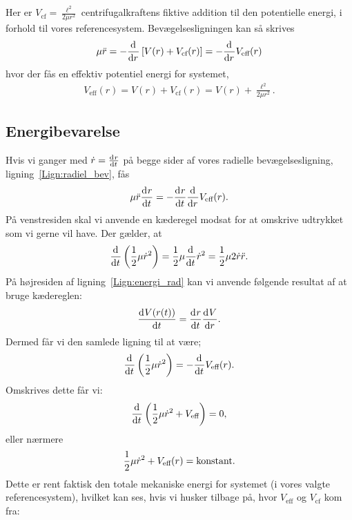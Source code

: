 Her er $V_\text{cf} = \frac{\ell ^2}{2\mu r^2}$ centrifugalkraftens fiktive addition til den potentielle energi, i forhold til vores referencesystem. Bevægelsesligningen kan så skrives
\begin{align} \label{Lign:radiel_bev}
	\mu \ddt{r} = -\dif{r}{} \left[V(r) + V_\text{cf} (r)\right] = -\dif{r}{} V_\text{eff}(r)
\end{align}
hvor der fås en effektiv potentiel energi for systemet, 
\begin{align}
	V_\text{eff}(r) = V(r) + V_\text{cf}(r) = V(r) + 	\frac{\ell ^2}{2\mu r^2}.
\end{align}

\subsection{Energibevarelse}
Hvis vi ganger med $\dt{r} = \dif{t}{r}$ på begge sider af vores radielle bevægelsesligning, ligning~\eqref{Lign:radiel_bev}, fås
\begin{align}\label{Lign:energi_rad}
	\mu \ddt{r} \dif{t}{r} = -\dif{t}{r} \dif{r}{} V_\text{eff}(r). 
\end{align}
På venstresiden skal vi anvende en kæderegel modsat for at omskrive udtrykket som vi gerne vil have. Der gælder, at 
\begin{align}
\dif{t}{} \left( \frac{1}{2} \mu \dt{r}^2 \right) = \frac{1}{2} \mu \dif{t}{} \dt{r}^2 = \frac{1}{2} \mu 2\dt{r} \ddt{r}.
\end{align}
På højresiden af ligning~\eqref{Lign:energi_rad} kan vi anvende følgende resultat af at bruge kædereglen:
\begin{align}
	\dif{t}{V(r(t))} = \dif{t}{r}\dif{r}{V}.
\end{align}
Dermed får vi den samlede ligning til at være;
\begin{align}
	\dif{t}{}\left(\frac{1}{2} \mu \dt{r}^2\right) = - \dif{t}{} V_\text{eff}(r).
\end{align}
Omskrives dette får vi:
\begin{align}
	\dif{t}{}\left(\frac{1}{2}\mu \dt{r}^2 + V_\text{eff}\right) = 0,
\end{align}
eller nærmere
\begin{align} \label{eq:Bevaegelsesligningerne_energi}
	\frac{1}{2} \mu \dt{r}^2 + V_\text{eff}(r) = \mathrm{konstant}.
\end{align}
Dette er rent faktisk den totale mekaniske energi for systemet (i vores valgte referencesystem), hvilket kan ses, hvis vi husker tilbage på, hvor $V_\text{eff}$ og $V_\text{cf}$ kom fra:
